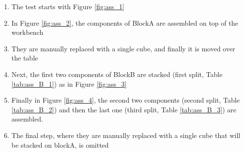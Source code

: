 \begin{enumerate}
	\item The test starts with Figure \ref{fig:ass_1}
	\item In Figure \ref{fig:ass_2}, the components of BlockA are assembled on top of the workbench 
	\item They are manually replaced with a single cube, and finally it is moved over the table
	\item Next, the first two components of BlockB are stacked (first split, Table \ref{tab:ass_B_1}) as in Figure \ref{fig:ass_3}
	\item Finally in Figure \ref{fig:ass_4}, the second two components (second split, Table \ref{tab:ass_B_2}) and then the last one (third split, Table \ref{tab:ass_B_3}) are assembled. 
	\item The final step, where they are manually replaced with a single cube that will be stacked on blockA, is omitted
\end{enumerate}

